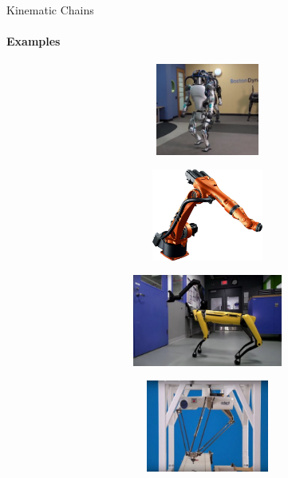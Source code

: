 \documentclass[aspectratio=169]{beamer}
\begin{document}
\begin{frame}[t]{Kinematic Chains}
\framesubtitle{Examples}
\vspace{-0.5cm}
    \begin{figure}[H]
        \begin{subfigure}{0.49\textwidth}
            \centering\includegraphics[height=3cm,width=1\textwidth,keepaspectratio]{kc_1.png}
            \label{fig:kc_1.png}
        \end{subfigure}
        \begin{subfigure}{0.49\textwidth}
            \centering\includegraphics[height=3cm,width=1\textwidth,keepaspectratio]{kc_2.png}
            \label{fig:kc_2.png}
        \end{subfigure}

        \begin{subfigure}{0.49\textwidth}
            \centering\includegraphics[height=3cm,width=1\textwidth,keepaspectratio]{kc_3.png}
            \label{fig:kc_3.png}
        \end{subfigure}
        \begin{subfigure}{0.49\textwidth}
            \centering\includegraphics[height=3cm,width=1\textwidth,keepaspectratio]{kc_4.png}
            \label{fig:kc_4.png}
        \end{subfigure}
    \end{figure}
\end{frame}
\end{document}
